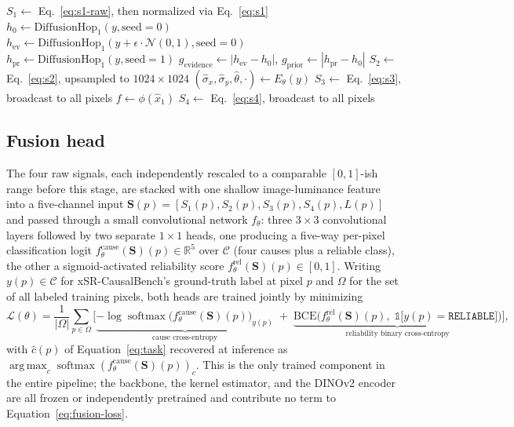 \documentclass[review]{elsarticle}
\begin{document}
\begin{algorithm}[h]
\SetAlgoLined
{}
$S_1 \gets$ Eq.~\ref{eq:s1-raw}, then normalized via Eq.~\ref{eq:s1}\;
$h_0 \gets \mathrm{DiffusionHop}_1(y, \mathrm{seed}=0)$\;
$h_{\mathrm{ev}} \gets \mathrm{DiffusionHop}_1(y + \epsilon \cdot \mathcal{N}(0,1), \mathrm{seed}=0)$ 
$h_{\mathrm{pr}} \gets \mathrm{DiffusionHop}_1(y, \mathrm{seed}=1)$ 
$g_{\mathrm{evidence}} \gets |h_{\mathrm{ev}} - h_0|$, $g_{\mathrm{prior}} \gets |h_{\mathrm{pr}} - h_0|$\;
$S_2 \gets$ Eq.~\ref{eq:s2}, upsampled to $1024\times1024$\;
$(\hat\sigma_x, \hat\sigma_y, \hat\theta, \cdot) \gets E_\theta(y)$\;
$S_3 \gets$ Eq.~\ref{eq:s3}, broadcast to all pixels\;
$f \gets \phi(\hat{x}_1)$ 
$S_4 \gets$ Eq.~\ref{eq:s4}, broadcast to all pixels\;
\Return{$[S_1, S_2, S_3, S_4]$}
\caption{Four-signal computation}
\label{alg:signals}
\end{algorithm}

\subsection{Fusion head}
\label{sec:fusion}

The four raw signals, each independently rescaled to a comparable $[0,1]$-ish range before this stage, are stacked with one shallow image-luminance feature into a five-channel input $\mathbf{S}(p) = [S_1(p), S_2(p), S_3(p), S_4(p), L(p)]$ and passed through a small convolutional network $f_\theta$: three $3\times3$ convolutional layers followed by two separate $1\times1$ heads, one producing a five-way per-pixel classification logit $f_\theta^{\mathrm{cause}}(\mathbf{S})(p) \in \mathbb{R}^{5}$ over $\mathcal{C}$ (four causes plus a reliable class), the other a sigmoid-activated reliability score $f_\theta^{\mathrm{rel}}(\mathbf{S})(p) \in [0,1]$. Writing $y(p) \in \mathcal{C}$ for xSR-CausalBench's ground-truth label at pixel $p$ and $\Omega$ for the set of all labeled training pixels, both heads are trained jointly by minimizing
\begin{equation}
\mathcal{L}(\theta) = \frac{1}{|\Omega|}\sum_{p \in \Omega} \Big[ \underbrace{-\log \operatorname{softmax}\!\big(f_\theta^{\mathrm{cause}}(\mathbf{S})(p)\big)_{y(p)}}_{\text{cause cross-entropy}} \;+\; \underbrace{\mathrm{BCE}\Big(f_\theta^{\mathrm{rel}}(\mathbf{S})(p),\; \mathbb{1}\big[y(p) = \texttt{RELIABLE}\big]\Big)}_{\text{reliability binary cross-entropy}} \Big],
\label{eq:fusion-loss}
\end{equation}
with $\hat{c}(p)$ of Equation~\ref{eq:task} recovered at inference as $\operatorname*{arg\,max}_c \operatorname{softmax}(f_\theta^{\mathrm{cause}}(\mathbf{S})(p))_c$. This is the only trained component in the entire pipeline; the backbone, the kernel estimator, and the DINOv2 encoder are all frozen or independently pretrained and contribute no term to Equation~\ref{eq:fusion-loss}.
\end{document}
